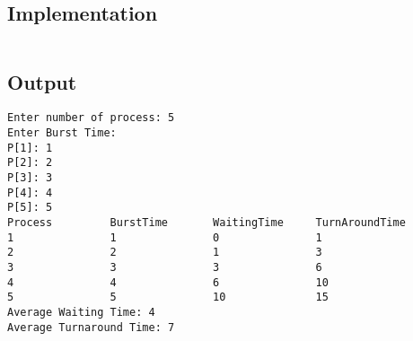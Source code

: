 \subsection{Implementation}

\inputminted[fontsize=\footnotesize,autogobble]{c}{code/sjf.c}

\subsection{Output}
\begin{lstlisting}[style=output]
Enter number of process: 5
Enter Burst Time:
P[1]: 1
P[2]: 2
P[3]: 3
P[4]: 4
P[5]: 5
Process         BurstTime       WaitingTime     TurnAroundTime
1               1               0               1
2               2               1               3
3               3               3               6
4               4               6               10
5               5               10              15
Average Waiting Time: 4
Average Turnaround Time: 7
\end{lstlisting}

